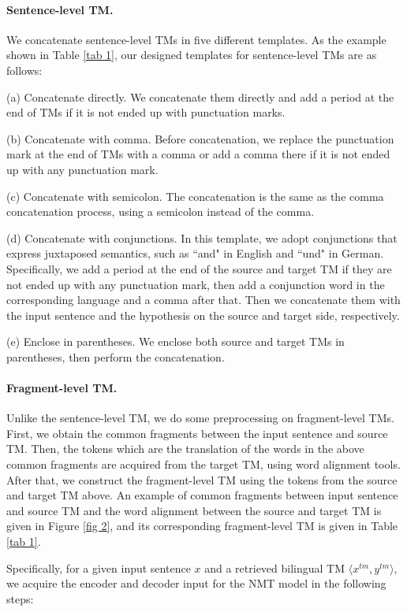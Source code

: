 \documentclass[letterpaper]{article} %
\begin{document}
\paragraph{Sentence-level TM.} We concatenate sentence-level TMs in five different templates. As the example shown in Table \ref{tab 1}, our designed templates for sentence-level TMs are as follows:

(a) Concatenate directly. We concatenate them directly and add a period at the end of TMs if it is not ended up with punctuation marks.

(b) Concatenate with comma. Before concatenation, we replace the punctuation mark at the end of TMs with a comma or add a comma there if it is not ended up with any punctuation mark.

(c) Concatenate with semicolon. The concatenation is the same as the comma concatenation process, using a semicolon instead of the comma.

(d) Concatenate with conjunctions. In this template, we adopt conjunctions that express juxtaposed semantics, such as ``and" in English and ``und" in German. Specifically, we add a period at the end of the source and target TM if they are not ended up with any punctuation mark, then add a conjunction word in the corresponding language and a comma after that. Then we concatenate them with the input sentence and the hypothesis on the source and target side, respectively.

(e) Enclose in parentheses. We enclose both source and target TMs in parentheses, then perform the concatenation.

\paragraph{Fragment-level TM.} Unlike the sentence-level TM, we do some preprocessing on fragment-level TMs. First, we obtain the common fragments between the input sentence and source TM. Then, the tokens which are the translation of the words in the above common fragments are acquired from the target TM, using word alignment tools. After that, we construct the fragment-level TM using the tokens from the source and target TM above. An example of common fragments between input sentence and source TM and the word alignment between the source and target TM is given in Figure \ref{fig 2}, and its corresponding fragment-level TM is given in Table \ref{tab 1}. 

Specifically, for a given input sentence $x$ and a retrieved bilingual TM $\langle x^{tm},y^{tm}\rangle$, we acquire the encoder and decoder input for the NMT model in the following steps:
\end{document}
